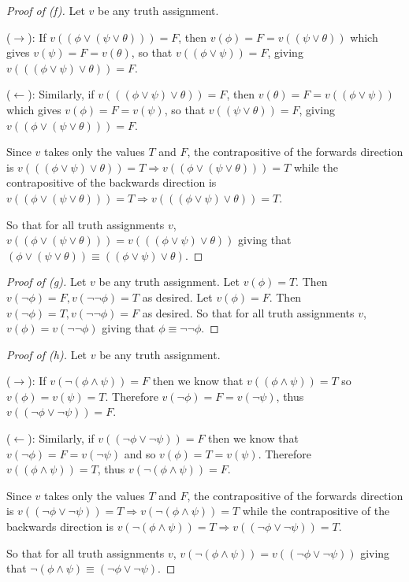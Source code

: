 \documentclass{article}
\theoremstyle{remark}\newtheorem{remark}{Remark}
\theoremstyle{plain}
\begin{document}
\begin{proof}[Proof of (f)]
    Let $v$ be any truth assignment.

    ($\rightarrow$):
    If $v((\phi \lor (\psi \lor \theta))) = F$, then $v(\phi) = F = v((\psi \lor \theta))$ which gives $v(\psi) = F = v(\theta)$, so that $v((\phi \lor \psi)) = F$, giving $v(((\phi \lor \psi) \lor \theta)) = F$.

    ($\leftarrow$):
    Similarly, if $v(((\phi \lor \psi) \lor \theta)) = F$, then $v(\theta) = F = v((\phi \lor \psi))$ which gives $v(\phi) = F = v(\psi)$, so that $v((\psi \lor \theta)) = F$, giving $v((\phi \lor (\psi \lor \theta))) = F$.

    Since $v$ takes only the values $T$ and $F$, the contrapositive of the forwards direction is $v(((\phi \lor \psi) \lor \theta)) = T \Rightarrow v((\phi \lor (\psi \lor \theta))) = T$ while the contrapositive of the backwards direction is $v((\phi \lor (\psi \lor \theta))) = T \Rightarrow v(((\phi \lor \psi) \lor \theta)) = T$.

    So that for all truth assignments $v$, $v((\phi \lor (\psi \lor \theta))) = v(((\phi \lor \psi) \lor \theta))$ giving that $(\phi \lor (\psi \lor \theta)) \equiv ((\phi \lor \psi) \lor \theta)$.
\end{proof}

\begin{proof}[Proof of (g)]
    Let $v$ be any truth assignment. Let $v(\phi) = T$. Then $v(\neg\phi) = F, v(\neg\neg\phi) = T$ as desired. Let $v(\phi) = F$. Then $v(\neg\phi) = T, v(\neg\neg\phi) = F$ as desired. So that for all truth assignments $v$, $v(\phi) = v(\neg\neg\phi)$ giving that $\phi \equiv \neg\neg\phi$.
\end{proof}

\begin{proof}[Proof of (h)]
    Let $v$ be any truth assignment.

    ($\rightarrow$):
    If $v(\neg(\phi \land \psi)) = F$ then we know that $v((\phi \land \psi)) = T$ so $v(\phi) = v(\psi) = T$. Therefore $v(\neg\phi) = F = v(\neg\psi)$, thus $v((\neg \phi \lor \neg\psi)) = F$.

    ($\leftarrow$):
    Similarly, if $v((\neg \phi \lor \neg\psi)) = F$ then we know that $v(\neg\phi) = F = v(\neg\psi)$ and so $v(\phi) = T = v(\psi)$. Therefore $v((\phi \land \psi)) = T$, thus $v(\neg(\phi\land\psi)) = F$.

    Since $v$ takes only the values $T$ and $F$, the contrapositive of the forwards direction is $v((\neg\phi \lor \neg\psi)) = T \Rightarrow v(\neg(\phi \land \psi)) = T$ while the contrapositive of the backwards direction is $v(\neg(\phi \land \psi)) = T \Rightarrow v((\neg\phi \lor \neg\psi)) = T$.

    So that for all truth assignments $v$, $v(\neg(\phi \land \psi)) = v((\neg \phi \lor \neg\psi))$ giving that $\neg(\phi \land \psi) \equiv (\neg \phi \lor \neg\psi)$.
\end{proof}
\end{document}
